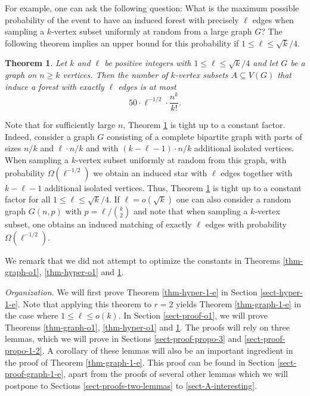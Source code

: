 \documentclass[11pt]{article}
\newtheorem{theorem}{Theorem}[section]
\theoremstyle{definition}
\numberwithin{equation}{section}
\begin{document}
For example, one can ask the following question: What is the maximum possible probability of the event to have an induced forest with precisely $\ell$ edges when sampling a $k$-vertex subset uniformly at random from a large graph $G$? The following theorem implies an upper bound for this probability if $1\leq \ell\leq \sqrt{k}/4$.

\begin{theorem}\label{thm-graph-forest}Let $k$ and $\ell$ be positive integers with $1\leq \ell\leq \sqrt{k}/4$ and let $G$ be a graph on $n \geq k$ vertices. Then the number of $k$-vertex subsets $A\subseteq V(G)$ that induce a forest with exactly $\ell$ edges is at most
\[50\cdot \ell^{-1/2}\cdot \frac{n^k}{k!}.\]
\end{theorem}

Note that for sufficiently large $n$, Theorem \ref{thm-graph-forest} is tight up to a constant factor. Indeed, consider a graph $G$ consisting of a complete bipartite graph with parts of sizes $n/k$ and $\ell\cdot n/k$ and with $(k-\ell-1)\cdot n/k$ additional isolated vertices. When sampling a $k$-vertex subset uniformly at random from this graph, with probability $\Omega(\ell^{-1/2})$ we obtain an induced star with $\ell$ edges together with $k-\ell-1$ additional isolated vertices. Thus, Theorem \ref{thm-graph-forest} is tight up to a constant factor for all $1\leq \ell\leq \sqrt{k}/4$. If $\ell=o(\sqrt{k})$ one can also consider a random graph $G(n,p)$ with $p=\ell/{k \choose 2}$ and note that when sampling a $k$-vertex subset, one obtains an induced matching of exactly $\ell$ edges with probability $\Omega(\ell^{-1/2})$.  

We remark that we did not attempt to optimize the constants in Theorems \ref{thm-graph-o1}, \ref{thm-hyper-o1} and \ref{thm-graph-forest}.

\noindent\textit{Organization.} We will first prove Theorem \ref{thm-hyper-1-e} in Section \ref{sect-hyper-1-e}. Note that applying this theorem to $r=2$ yields Theorem \ref{thm-graph-1-e} in the case where $1\leq \ell\leq o(k)$. In Section \ref{sect-proof-o1}, we will prove Theorems \ref{thm-graph-o1}, \ref{thm-hyper-o1} and \ref{thm-graph-forest}. The proofs will rely on three lemmas, which we will prove in Sections \ref{sect-proof-propo-3} and \ref{sect-proof-propo-1-2}. A corollary of these lemmas will also be an important ingredient in the proof of Theorem \ref{thm-graph-1-e}. This proof can be found in Section \ref{sect-proof-graph-1-e}, apart from the proofs of several other lemmas which we will postpone to Sections \ref{sect-proofs-two-lemmas} to \ref{sect-A-interesting}.
\end{document}
